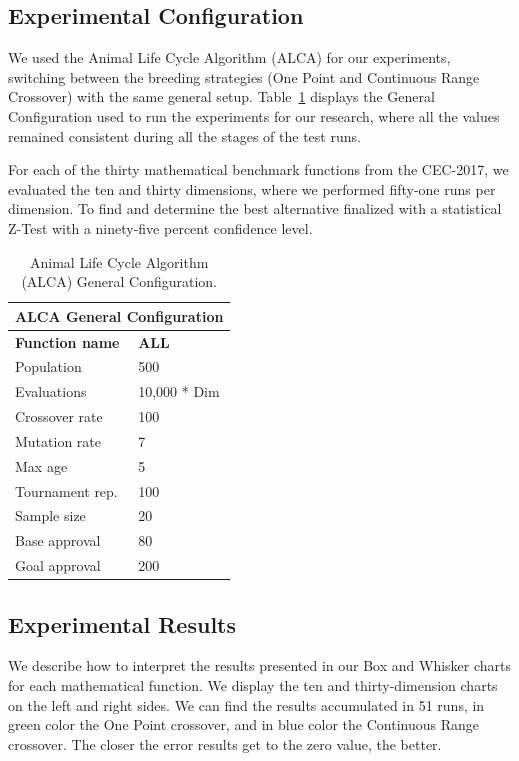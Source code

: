 \documentclass[graybox]{svmult}
\begin{document}
    \subsection{Experimental Configuration}

    We used the Animal Life Cycle Algorithm (ALCA) for our experiments, switching between the breeding strategies (One Point and Continuous Range Crossover) with the same general setup. Table~\ref{tab.general_configuration} displays the General Configuration used to run the experiments for our research, where all the values remained consistent during all the stages of the test runs.

    For each of the thirty mathematical benchmark functions from the CEC-2017, we evaluated the ten and thirty dimensions, where we performed fifty-one runs per dimension. To find and determine the best alternative finalized with a statistical Z-Test with a ninety-five percent confidence level.

    \begin{table}[]
    \scriptsize
    \centering
    \caption{Animal Life Cycle Algorithm (ALCA) General Configuration.}\label{tab.general_configuration}    
    \begin{tabular}{@{}ll@{}}
    \toprule
    \multicolumn{2}{l}{\textbf{ALCA   General Configuration}} \\ \midrule
    \textbf{Function name} & \textbf{ALL} \\
    Population & 500 \\
    Evaluations & 10,000 * Dim \\
    Crossover rate & 100 \\
    Mutation rate & 7 \\
    Max age & 5 \\
    Tournament rep. & 100 \\
    Sample size & 20 \\
    Base approval & 80 \\
    Goal approval & 200 \\ \bottomrule
    \end{tabular}
    \end{table}

    \FloatBarrier


    \subsection{Experimental Results}

    We describe how to interpret the results presented in our Box and Whisker charts for each mathematical function. We display the ten and thirty-dimension charts on the left and right sides. We can find the results accumulated in 51 runs, in green color the One Point crossover, and in blue color the Continuous Range crossover. The closer the error results get to the zero value, the better.
\end{document}
